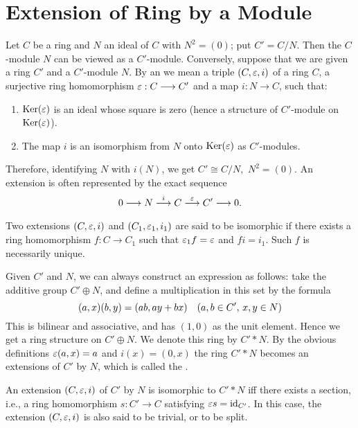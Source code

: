 \documentclass[../main]{subfiles}
\begin{document}
\section{Extension of Ring by a Module}\label{sec:25}

\newparagraph
Let $C$ be a ring and $N$ an ideal of $C$ with $N^2=(0)$; put $C'=C/N$. Then the $C$-module $N$ can be viewed as a $C'$-module. Conversely, suppose that we are given a ring $C'$ and a $C'$-module $N$. By an  we mean a triple $(C,\varepsilon,i)$ of a ring $C$, a surjective ring homomorphism $\varepsilon:C\longrightarrow C'$ and a map $i:N\longrightarrow C$, such that:
\begin{enumerate}
    \item $\operatorname{Ker}(\varepsilon)$ is an ideal whose square is zero (hence a structure of $C'$-module on $\operatorname{Ker}(\varepsilon)$).
    \item The map $i$ is an isomorphism from $N$ onto $\operatorname{Ker}(\varepsilon)$ as $C'$-modules.
\end{enumerate}
Therefore, identifying $N$ with $i(N)$, we get $C'\cong C/N$, $\, N^2=(0)$. An extension is often represented by the exact sequence \[0\longrightarrow N\varrightarrow iC\varrightarrow\ep C'\longrightarrow0.\] Two extensions $(C,\varepsilon,i)$ and $(C_1,\varepsilon_1,i_1)$ are said to be isomorphic if there exists a ring homomorphism $f:C\longrightarrow C_1$ such that $\varepsilon_1f=\varepsilon$ and $fi=i_1$. Such $f$ is necessarily unique.

\newparagraph
Given $C'$ and $N$, we can always construct an expression as follows: take the additive group $C'\oplus N$, and define a multiplication in this set by the formula
\[(a,x)(b,y) = (ab,ay+bx)
\for{a,b\in C',\,x,y\in N}\]
This is bilinear and associative, and has $(1,0)$ as the unit element. Hence we get a ring structure on $C'\oplus N$. We denote this ring by $C'* N$. By the obvious definitions $\varepsilon(a,x) = a$ and $i(x) = (0,x)$ the ring $C'*N$ becomes an extensions of $C'$ by $N$, which is called the .

An extension $(C,\varepsilon,i)$ of $C'$ by $N$ is isomorphic to $C'*N$ iff there exists a section, i.e., a ring homomorphism $s:C'\longrightarrow C$ satisfying $\varepsilon s=\operatorname{id}_{C'}$. In this case, the extension $(C,\varepsilon,i)$ is also said to be trivial, or to be split.
\end{document}
